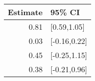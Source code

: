 \begin{tabular}{rl}
  \hline
Estimate & 95\% CI \\ 
  \hline
0.81 & [0.59,1.05] \\ 
  0.03 & [-0.16,0.22] \\ 
  0.45 & [-0.25,1.15] \\ 
  0.38 & [-0.21,0.96] \\ 
   \hline
\end{tabular}

